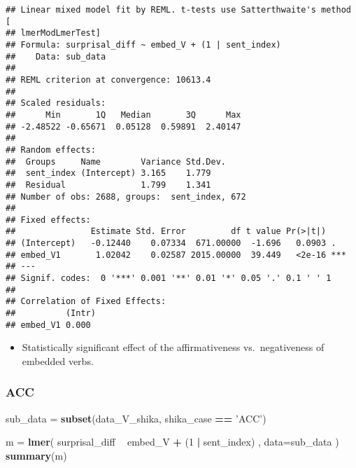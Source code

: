 \documentclass[]{ltjsarticle}
\newenvironment{Shaded}{\begin{snugshade}}{\end{snugshade}}
\newcommand{\KeywordTok}[1]{\textcolor[rgb]{0.13,0.29,0.53}{\textbf{#1}}}
\newcommand{\DataTypeTok}[1]{\textcolor[rgb]{0.13,0.29,0.53}{#1}}
\newcommand{\DecValTok}[1]{\textcolor[rgb]{0.00,0.00,0.81}{#1}}
\newcommand{\StringTok}[1]{\textcolor[rgb]{0.31,0.60,0.02}{#1}}
\newcommand{\OperatorTok}[1]{\textcolor[rgb]{0.81,0.36,0.00}{\textbf{#1}}}
\newcommand{\NormalTok}[1]{#1}
\providecommand{\tightlist}{%
  \setlength{\itemsep}{0pt}\setlength{\parskip}{0pt}}
\begin{document}
\begin{verbatim}
## Linear mixed model fit by REML. t-tests use Satterthwaite's method [
## lmerModLmerTest]
## Formula: surprisal_diff ~ embed_V + (1 | sent_index)
##    Data: sub_data
## 
## REML criterion at convergence: 10613.4
## 
## Scaled residuals: 
##      Min       1Q   Median       3Q      Max 
## -2.48522 -0.65671  0.05128  0.59891  2.40147 
## 
## Random effects:
##  Groups     Name        Variance Std.Dev.
##  sent_index (Intercept) 3.165    1.779   
##  Residual               1.799    1.341   
## Number of obs: 2688, groups:  sent_index, 672
## 
## Fixed effects:
##               Estimate Std. Error         df t value Pr(>|t|)    
## (Intercept)   -0.12440    0.07334  671.00000  -1.696   0.0903 .  
## embed_V1       1.02042    0.02587 2015.00000  39.449   <2e-16 ***
## ---
## Signif. codes:  0 '***' 0.001 '**' 0.01 '*' 0.05 '.' 0.1 ' ' 1
## 
## Correlation of Fixed Effects:
##          (Intr)
## embed_V1 0.000
\end{verbatim}

\begin{itemize}
\tightlist
\item
  Statistically significant effect of the affirmativeness
  vs.~negativeness of embedded verbs.
\end{itemize}

\subsubsection{ACC}\label{acc}

\begin{Shaded}
\begin{Highlighting}[]
\NormalTok{sub_data =}\StringTok{ }\KeywordTok{subset}\NormalTok{(data_V_shika, shika_case }\OperatorTok{==}\StringTok{ 'ACC'}\NormalTok{)}

\NormalTok{m =}\StringTok{ }\KeywordTok{lmer}\NormalTok{(}
\NormalTok{        surprisal_diff}
            \OperatorTok{~}\StringTok{ }\NormalTok{embed_V}
                \OperatorTok{+}\StringTok{ }\NormalTok{(}\DecValTok{1} \OperatorTok{|}\StringTok{ }\NormalTok{sent_index)}
\NormalTok{        ,}
        \DataTypeTok{data=}\NormalTok{sub_data}
\NormalTok{        )}
\KeywordTok{summary}\NormalTok{(m)}
\end{Highlighting}
\end{Shaded}
\end{document}
